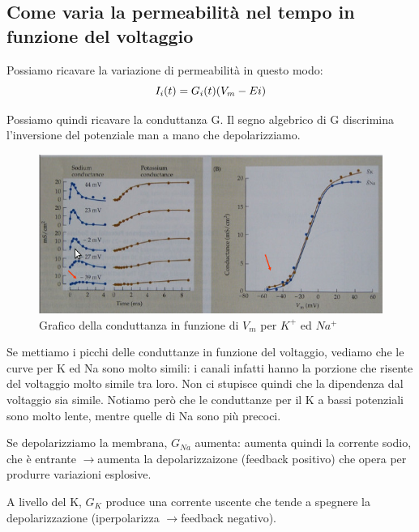 \documentclass[a4paper,12pt]{article}
\newcommand{\lfreccia}{\ensuremath{\longrightarrow}}
\begin{document}
\subsection{Come varia la permeabilità nel tempo in funzione del voltaggio}
Possiamo ricavare la variazione di permeabilità in questo modo:
\begin{equation}
\centering
I_{i}(t)=G_{i}(t) (V_{m}-E{i})
\end{equation}

Possiamo quindi ricavare la conduttanza G. Il segno algebrico di G discrimina l'inversione del potenziale man a mano che depolarizziamo. 

\begin{figure}[H]
\centering
\includegraphics[scale=0.5]{immagine/conduttanze.jpg}
\caption{Grafico della conduttanza in funzione di $V_{m}$ per $K^{+}$ ed $Na^{+}$}
\end{figure}
Se mettiamo i picchi delle conduttanze in funzione del voltaggio, vediamo che le curve per K ed Na sono molto simili: i canali infatti hanno la porzione che risente del voltaggio molto simile tra loro. Non ci stupisce quindi che la dipendenza dal voltaggio sia simile. Notiamo però che le conduttanze per il K a bassi potenziali sono molto lente, mentre quelle di Na sono più precoci.

Se depolarizziamo la membrana, $G_{Na}$ aumenta: aumenta quindi la corrente sodio, che è entrante \lfreccia aumenta la depolarizzaizone (feedback positivo) che opera per produrre variazioni esplosive.

A livello del K, $G_{K}$ produce una corrente uscente che tende a spegnere la depolarizzazione (iperpolarizza \lfreccia feedback negativo).
\end{document}
